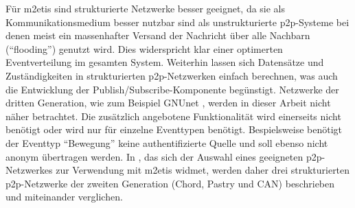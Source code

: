 Für \ac{m2etis} sind strukturierte Netzwerke besser geeignet, da sie als Kommunikationsmedium besser nutzbar sind als unstrukturierte p2p-Systeme bei denen meist ein massenhafter Versand der Nachricht über alle Nachbarn (\enquote{flooding}) genutzt wird. Dies widerspricht klar einer optimerten Eventverteilung im gesamten System. Weiterhin lassen sich Datensätze und Zuständigkeiten in strukturierten p2p-Netzwerken einfach berechnen, was auch die Entwicklung der Publish/Subscribe-Komponente begünstigt. Netzwerke der dritten Generation, wie zum Beispiel GNUnet \cite{Bennett2002GNet}, werden in dieser Arbeit nicht näher betrachtet. Die zusätzlich angebotene Funktionalität wird einerseits nicht benötigt oder wird nur für einzelne Eventtypen benötigt. Bespielsweise benötigt der Eventtyp \enquote{Bewegung} keine authentifizierte Quelle und soll ebenso nicht anonym übertragen werden. In , das sich der Auswahl eines geeigneten p2p-Netzwerkes zur Verwendung mit \ac{m2etis} widmet, werden daher drei strukturierten \ac{p2p}-Netzwerke der zweiten Generation (Chord, Pastry und CAN) beschrieben und miteinander verglichen.


